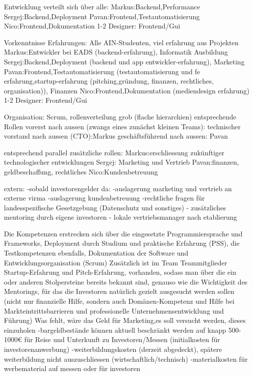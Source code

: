  Entwicklung verteilt sich über alle:
 Markus:Backend,Performance
 Sergej:Backend,Deployment
 Pavan:Frontend,Testautomatisierung
 Nico:Frontend,Dokumentation
 1-2 Designer: Frontend/Gui
 
 Vorkenntnisse Erfahrungen: Alle AIN-Studenten, viel erfahrung aus Projekten
 Markus:Entwickler bei EADS (backend-erfahrung), Informatik Ausbildung
 Sergej:Backend,Deployment (backend und app entwickler-erfahrung), Marketing
 Pavan:Frontend,Testautomatisierung (testautomatisierung und fe erfahrung,startup-erfahrung (pitching,gründung, finanzen, rechtliches, organisation)), Finanzen
 Nico:Frontend,Dokumentation (mediendesign erfahrung)
 1-2 Designer: Frontend/Gui
 
 Organisation: Scrum, rollenverteilung grob (flache hierarchien)
 entsprechende Rollen vorerst nach aussen (zwangs eines zunächst kleinen Teams):
 technischer vorstand nach aussen (CTO):Markus
 geschäftsführend nach aussen: Pavan 
 
 entsprechend parallel zusätzliche rollen:
 Markus:erschliessung zukünftiger technologischer entwicklungen
 Sergej: Marketing und Vertrieb
 Pavan:finanzen, geldbeschaffung, rechtliches
 Nico:Kundenbetreuung
 
 extern:
 -sobald investorengelder da:
 -auslagerung marketing und vertrieb an externe virma
 -auslagerung kundenbetreuung
 -rechtliche fragen für landesspezifische Gesetzgebung (Datenschutz und sonstiges)
 - zusätzliches mentoring durch eigene investoren
 - lokale vertriebsmanager nach etablierung
 
 
 Die Kompetenzen erstrecken sich über die eingesetzte Programmiersprache und Frameworks, Deployment durch Studium und praktische Erfahrung (PSS),
 die Testkompetenzen ebenfalls, Dokumentation der Software und Entwicklungsorganisation (Scrum)
 Zusätzlich ist im Team Teammitglieder Startup-Erfahrung und Pitch-Erfahrung, vorhanden, sodass man über die ein oder anderen Stolpersteine bereits bekannt sind, genauso
 wie die Wichtigkeit des Mentorings, für das die Investoren natürlich gezielt ausgesucht werden sollen (nicht nur finanzielle Hilfe, sondern auch Domänen-Kompetenz und Hilfe bei Markteintrittsbarrieren
 und professionelle Unternehmensentwicklung und Führung)
 Was fehlt, wäre das Geld für Marketing,es soll versucht werden, dieses einzuholen
 -bargeldbestände können aktuell beschränkt werden auf knapp 500-1000€ für Reise und Unterkunft zu Investoren/Messen (initialkosten für investorenanwerbung)
 -weiterbildungskosten (derzeit abgedeckt), spätere weiterbildung nicht auszuschliessen (wirtschaftlich/technisch)
 -materialkosten für werbematerial auf messen oder für investoren
 
